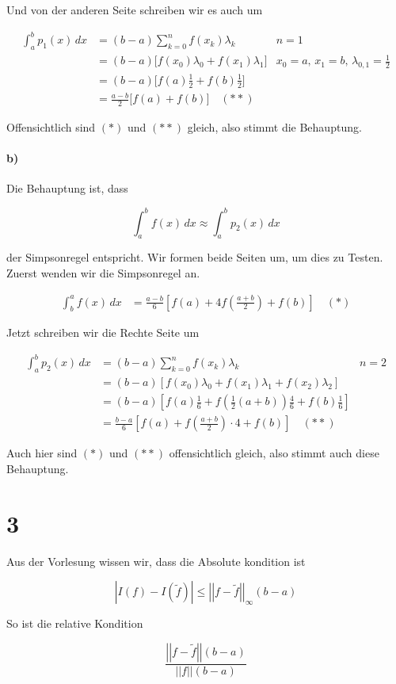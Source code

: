 \documentclass[ngerman,a4paper]{scrartcl}
\newcommand{\norm}[1]{\left|\!\left|#1\right|\! \right|}
\begin{document}
Und von der anderen Seite schreiben wir es auch um

\begin{align*}
  \int^b_a p_1(x)\, dx &= (b-a) \sum^n_{k=0} f(x_k) \lambda_k & n = 1\\
  &= (b-a)\big[f(x_0)\lambda_0 + f(x_1)\lambda_1\big] &  x_0 = a,\, x_1 = b,\, \lambda_{0,1}
  = \frac{1}{2}\\
  &= (b-a)\big[f(a)\frac{1}{2} + f(b)\frac{1}{2}\big]\\
  &= \frac{a-b}{2} \big[f(a) + f(b)\big] \quad (**)
\end{align*}

Offensichtlich sind $(*)$ und $(**)$ gleich, also stimmt die Behauptung.

\paragraph{b)}

Die Behauptung ist, dass 

\[
\int^b_a f(x)\, dx \approx \int^b_a p_2(x)\, dx
\]

der Simpsonregel entspricht. Wir formen beide Seiten um, um dies zu
Testen. Zuerst wenden wir die Simpsonregel an.

\begin{align*}
  \int^a_b f(x)\, dx &= \frac{a-b}{6} \left[ f(a) +
    4f\left(\frac{a+b}{2}\right) + f(b)\right] \quad (*)
\end{align*}

Jetzt schreiben wir die Rechte Seite um

\begin{align*}
  \int^b_a p_2(x)\, dx &= (b-a) \sum^n_{k=0} f(x_k) \lambda_k & n = 2\\
  &= (b-a)\left[f(x_0)\lambda_0 + f\left(x_1\right)\lambda_1 +
    f(x_2)\lambda_2\right]\\
  &= (b-a)\left[f(a)\frac{1}{6} +
    f\left(\frac{1}{2}(a+b)\right)\frac{4}{6} +
    f(b)\frac{1}{6}\right]\\
  &= \frac{b-a}{6} \left[f(a) + f\left(\frac{a+b}{2}\right)\cdot 4 +
    f(b) \right] \quad (**)
\end{align*}

Auch hier sind $(*)$ und $(**)$ offensichtlich gleich, also stimmt
auch diese Behauptung.

\section*{3}

Aus der Vorlesung wissen wir, dass die Absolute kondition ist

\[
|I(f) - I(\tilde{f})| \leq \norm{f-\tilde{f}}_\infty (b-a)
\]

So ist die relative Kondition

\[
\frac{\norm{f - \tilde{f}} (b-a)}{\norm{f} (b-a)}
\]
\end{document}
